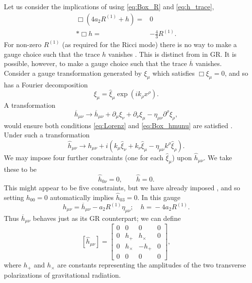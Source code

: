 Let us consider the implications of  using \eqref{eq:Box_R} and \eqref{eq:h_trace},
\begin{align}
\Box\left(4a_2R^{(1)} + h\right) = {} & 0 \nonumber \\*
\Box h = {} & -\frac{4}{3}R^{(1)}.
\end{align}
For non-zero $R^{(1)}$ (as required for the Ricci mode) there is no way to make a gauge choice such that the trace $h$ vanishes \citep{Corda2008, Capozziello2008}. This is distinct from in GR. It is possible, however, to make a gauge choice such that the trace $\overline{h}$ vanishes. Consider a gauge transformation generated by $\xi_\mu$ which satisfies $\Box \xi_\mu = 0$, and so has a Fourier decomposition
\begin{equation}
\xi_\mu = \widehat{\xi}_\mu \exp\left(ik_\rho x^\rho\right).
\end{equation}
A transformation
\begin{equation}
\overline{h}_{\mu\nu} \rightarrow \overline{h}_{\mu\nu} + \partial_\mu\xi_\nu + \partial_\nu\xi_\mu - \eta_{\mu\nu}\partial^\rho\xi_\rho,
\end{equation}
would ensure both conditions \eqref{eq:Lorenz} and \eqref{eq:Box_hmunu} are satisfied \cite[section 35.2]{Misner1973}. Under such a transformation
\begin{equation}
\widehat{h}_{\mu\nu} \rightarrow \widehat{h}_{\mu\nu} + i\left(k_\mu\widehat{\xi}_\nu + k_\nu\widehat{\xi}_\mu - \eta_{\mu\nu}k^\rho\widehat{\xi}_\rho\right).
\end{equation}
We may impose four further constraints (one for each $\widehat{\xi}_\mu$) upon $\widehat{h}_{\mu\nu}$. We take these to be \citep[section 4.4]{Wald1984}
\begin{equation}
\widehat{h}_{0\nu} = 0, \qquad \widehat{h} = 0.
\end{equation}
This might appear to be five constraints, but we have already imposed , and so setting $\widehat{h}_{00} = 0$ automatically implies $\widehat{h}_{03} = 0$. In this gauge
\begin{equation}
h_{\mu\nu} = {} \overline{h}_{\mu\nu} - a_2 R^{(1)}\eta_{\mu\nu}; \quad h = {} -4a_2R^{(1)}.
\label{eq:gauge}
\end{equation}
Thus $\overline{h}_{\mu\nu}$ behaves just as its GR counterpart; we can define
\begin{equation}
\left[\widehat{h}_{\mu\nu}\right] =
\begin{bmatrix}
0 & 0 & 0 & 0\\
0 & h_+ & h_\times & 0\\
0 & h_\times & -h_+ & 0\\
0 & 0 & 0 & 0
\end{bmatrix},
\end{equation}
where $h_+$ and $h_\times$ are constants representing the amplitudes of the two transverse polarizations of gravitational radiation.

